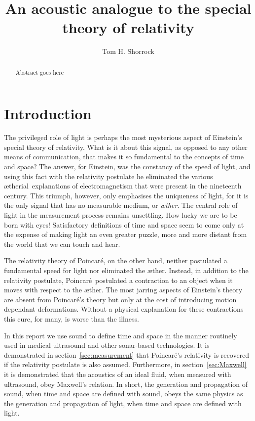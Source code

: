 \documentclass[10pt, fleqn,draft,showtrims,oldfontcommands]{article} %
\title{An acoustic analogue to the special theory of relativity}
\author{Tom H. Shorrock }
\newcommand{\aether}{\ae ther}
\newcommand{\aetherial}{\ae therial}
\newcommand{\Poincare}{Poincar{\'e}}
\begin{document}
\maketitle
\begin{abstract}
Abstract goes here
\end{abstract}

\section{Introduction}\label{sec:introduction}

The privileged role of light is perhaps the most mysterious aspect of Einstein's special theory of relativity.
What is it about this signal, as opposed to any other means of communication, that makes it  so fundamental to the  concepts of time and space?
The answer, for Einstein, was the constancy of the speed of light,
and using this fact with the relativity postulate he eliminated the  various \aetherial\ explanations of electromagnetism that were present in the nineteenth century.
This triumph, however, only emphasises the uniqueness of light, for it is the  only  signal that has no measurable medium, or {\em \aether}.
The central role of light in the measurement process remains unsettling. 
How lucky we are to be born with eyes! %
Satisfactory definitions of time and space seem to come only at the expense of making light  an even greater puzzle,
more and more distant from the world that we can touch and hear.

The relativity theory of \Poincare, on the other hand,  neither  postulated  a fundamental speed for light nor eliminated the \aether.
Instead, in addition to the relativity postulate, \Poincare\ postulated a  contraction to an object  when it moves with respect to the \aether.
The most jarring aspects of Einstein's theory are absent from \Poincare's theory but only at the cost of introducing motion dependant deformations.
Without a  physical explanation for these contractions
this cure, for many, is worse than the illness.

In this report we use sound to define time and space 
in the manner  routinely used in medical ultrasound and other sonar-based technologies.
It is demonstrated in section~\ref{sec:measurement} that \Poincare's relativity is recovered if the relativity postulate is also assumed.
Furthermore, in section~\ref{sec:Maxwell} it is demonstrated that the acoustics of an ideal fluid, when measured with ultrasound, 
obey Maxwell's relation.
In short, the generation and propagation of sound,  when time and space are defined with  sound,
obeys the same physics as the generation and propagation of light,  when time and space are defined with light.
\end{document}
